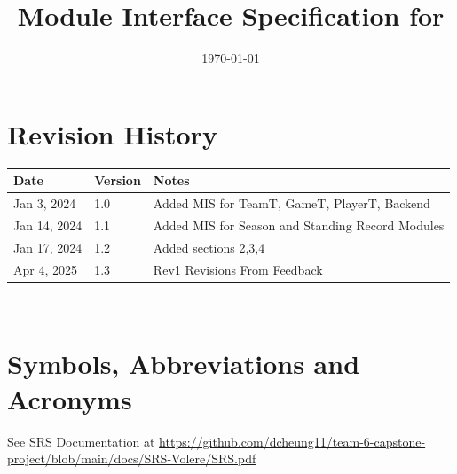 \documentclass[12pt, titlepage]{article}
\begin{document}
\title{Module Interface Specification for \progname{}}

\author{\authname}

\date{\today}

\maketitle


\section{Revision History}

\begin{tabularx}{\textwidth}{p{3cm}p{2cm}X}
  \toprule {\bf Date} & {\bf Version} & {\bf Notes}                                      \\
  \midrule
  Jan 3, 2024         & 1.0           & Added MIS for TeamT, GameT, PlayerT, Backend     \\
  Jan 14, 2024        & 1.1           & Added MIS for Season and Standing Record Modules \\
  Jan 17, 2024        & 1.2           & Added sections 2,3,4                             \\
  Apr 4, 2025         & 1.3           & Rev1 Revisions From Feedback                     \\
  \bottomrule
\end{tabularx}

~\newpage

\section{Symbols, Abbreviations and Acronyms}

See SRS Documentation at \url{https://github.com/dcheung11/team-6-capstone-project/blob/main/docs/SRS-Volere/SRS.pdf}
\end{document}
